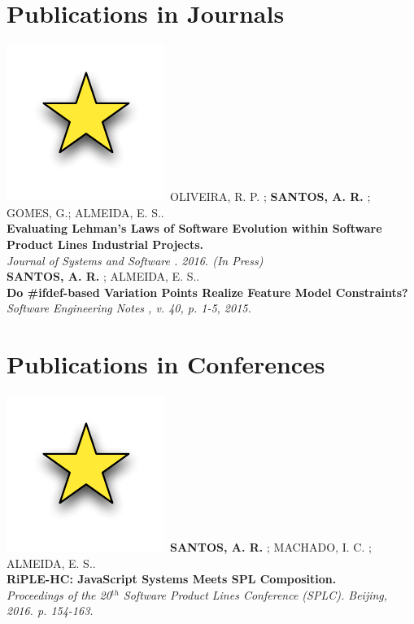 \documentclass[]{friggeri-cv}
\begin{document}
\section{Publications in Journals}

\includegraphics[scale=0.15]{img/star.pdf}~OLIVEIRA, R. P. ; \textbf{SANTOS, A. R.} ; GOMES, G.; ALMEIDA, E. S..\\
\textbf{Evaluating Lehman's Laws of Software Evolution within Software Product Lines Industrial Projects.}\\
\emph{Journal of Systems and Software . 2016. (In Press)}\\

\textbf{SANTOS, A. R.} ; ALMEIDA, E. S.. \\
\textbf{Do \#ifdef-based Variation Points Realize Feature Model Constraints?}\\
\emph{Software Engineering Notes , v. 40, p. 1-5, 2015.}\\


\section{Publications in Conferences}


\includegraphics[scale=.15]{img/star.pdf}~\textbf{SANTOS, A. R.} ; MACHADO, I. C. ; ALMEIDA, E. S..\\ 
\textbf{RiPLE-HC: JavaScript Systems Meets SPL Composition.}\\
\emph{Proceedings of the 20$^{th}$ Software Product Lines Conference (SPLC). Beijing, 2016. p. 154-163.}\\
\end{document}
